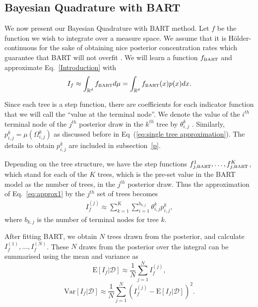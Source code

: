 
\subsection{Bayesian Quadrature with BART}
We now present our Bayesian Quadrature with BART method. Let $f$ be the function we wish to integrate over a measure space. We assume that it is H\"{o}lder-continuous for the sake of obtaining nice posterior concentration rates which guarantee that BART will not overfit \cite{rockova2019theory}.
We will learn a function $f_{\bart}$ and approximate Eq.~\eqref{Introduction} with
\begin{equation}
	I_f \approx \int_{\mathbb{R}^d} f_{\bart} d\mu = \int_{\mathbb{R}^d} f_{\bart}(x)p(x)dx.
\label{eq:approx1}
\end{equation}

Since each tree is a step function, there are coefficients for each indicator function that we will call the ``value at the terminal node''. We denote the value of the $i^{th}$ terminal node of the $j^{th}$ posterior draw in the $k^{th}$ tree by $\theta_{i,j}^k$ . Similarly, $p_{i,j}^k = \mu(\Omega_{i,j}^k)$ as discussed before in Eq~(\ref{eq:single tree approximation}). The details to obtain $p_{i,j}^k$ are included in subsection~\ref{p}.

Depending on the tree structure, we have the step functions $f^1_{j,\bart},\ldots,f^K_{j,\bart}$, which stand for each of the $K$ trees, which is the pre-set value in the BART model as the number of trees, in the $j^{th}$ posterior draw. Thus the approximation of Eq.~\eqref{eq:approx1} by the $j^{th}$ set of trees becomes
\begin{align}
	I_f^{(j)} \approx \sum_{k=1}^{K}\sum_{i=1}^{b_{k,j}} \theta_{i,j}^k p_{i,j}^k,
\end{align}
where $b_{k,j}$ is the number of terminal nodes for tree $k$.

After fitting BART, we obtain $N$  trees drawn from the posterior, and calculate $I_f^{(1)}, \ldots, I_f^{(N)}$. These $N$ draws from the posterior over the integral can be summarised using the mean and variance as
\begin{equation}
	\mbox{E}[I_f|\mathcal{D}] \approx \frac{1}{N} \sum_{j=1}^{N} I_f^{(j)},
\end{equation}
\begin{equation}
	\mbox{Var}[I_f|\mathcal{D}] \approx \frac{1}{N} \sum_{j=1}^N \left(I_f^{(j)} - \mbox{E}[I_f|\mathcal{D}]\right)^2.
\end{equation}

